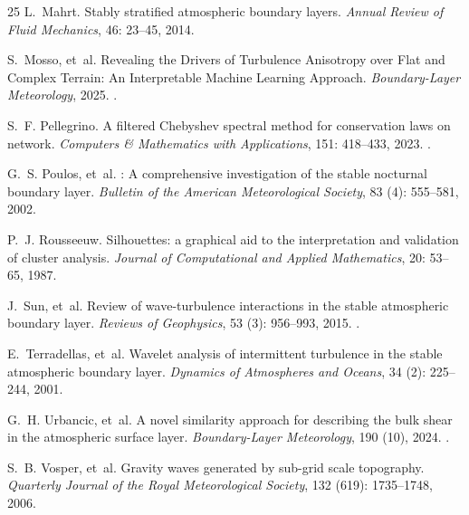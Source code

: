 \begin{thebibliography}{25}
L.~Mahrt.
\newblock Stably stratified atmospheric boundary layers.
\newblock \emph{Annual Review of Fluid Mechanics}, 46: 23--45, 2014.

S.~Mosso, et~al.
\newblock Revealing the Drivers of Turbulence Anisotropy over Flat and Complex Terrain: An Interpretable Machine Learning Approach.
\newblock \emph{Boundary-Layer Meteorology}, 2025.
\newblock {}.

S.~F. Pellegrino.
\newblock A filtered Chebyshev spectral method for conservation laws on network.
\newblock \emph{Computers \& Mathematics with Applications}, 151: 418--433, 2023.
\newblock {}.

G.~S. Poulos, et~al.
: A comprehensive investigation of the stable nocturnal boundary layer.
\newblock \emph{Bulletin of the American Meteorological Society}, 83 (4): 555--581, 2002.

P.~J. Rousseeuw.
\newblock Silhouettes: a graphical aid to the interpretation and validation of cluster analysis.
\newblock \emph{Journal of Computational and Applied Mathematics}, 20: 53--65, 1987.

J.~Sun, et~al.
\newblock Review of wave-turbulence interactions in the stable atmospheric boundary layer.
\newblock \emph{Reviews of Geophysics}, 53 (3): 956--993, 2015.
\newblock {}.

E.~Terradellas, et~al.
\newblock Wavelet analysis of intermittent turbulence in the stable atmospheric boundary layer.
\newblock \emph{Dynamics of Atmospheres and Oceans}, 34 (2): 225--244, 2001.

G.~H. Urbancic, et~al.
\newblock A novel similarity approach for describing the bulk shear in the atmospheric surface layer.
\newblock \emph{Boundary-Layer Meteorology}, 190 (10), 2024.
\newblock {}.

S.~B. Vosper, et~al.
\newblock Gravity waves generated by sub-grid scale topography.
\newblock \emph{Quarterly Journal of the Royal Meteorological Society}, 132 (619): 1735--1748, 2006.

\end{thebibliography}

